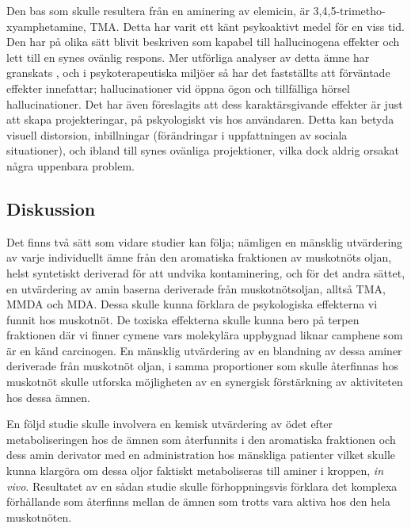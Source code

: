 \documentclass{theme/franska}
\begin{document}
{	Den bas som skulle resultera från en aminering av elemicin, är
	3,4,5-trimetho-xyamphetamine, TMA. Detta har varit ett känt psykoaktivt medel för en viss tid. \cite{peretz1955new}
	Den har på olika sätt blivit beskriven som kapabel till hallucinogena effekter
	och lett till en synes ovänlig respons. \cite{shulgin1995pihkal}
	Mer utförliga analyser av detta ämne har granskats \cite{shulgin1995pihkal}, och i psykoterapeutiska miljöer så har det fastställts att förväntade effekter innefattar; hallucinationer vid öppna ögon och tillfälliga hörsel hallucinationer.
	Det har även föreslagits att dess karaktärsgivande effekter är just att skapa projekteringar, på pskyologiskt vis hos användaren.
	Detta kan betyda visuell distorsion, inbillningar (förändringar i uppfattningen av sociala situationer), och ibland till synes ovänliga projektioner, vilka dock aldrig orsakat några uppenbara problem.

	\subsection{Diskussion}

Det finns två sätt som vidare studier kan följa; nämligen en mänsklig utvärdering
av varje individuellt ämne från den aromatiska fraktionen av muskotnöts oljan,
helst syntetiskt deriverad för att undvika kontaminering, och för det andra sättet,
en utvärdering av amin baserna deriverade från muskotnötsoljan, alltså
TMA, MMDA och MDA. Dessa skulle kunna förklara de psykologiska effekterna
vi funnit hos muskotnöt. De toxiska effekterna skulle kunna bero på terpen fraktionen
där vi finner cymene vars molekylära uppbygnad liknar camphene som är en känd
carcinogen. En mänsklig utvärdering av en blandning av dessa aminer deriverade från
muskotnöt oljan, i samma proportioner som skulle återfinnas hos muskotnöt skulle
utforska möjligheten av en synergisk förstärkning av aktiviteten hos dessa ämnen.

En följd studie skulle involvera en kemisk utvärdering av ödet efter metaboliseringen
hos de ämnen som återfunnits i den aromatiska fraktionen och dess amin derivator
med en administration hos mänskliga patienter vilket skulle kunna klargöra om dessa
oljor faktiskt metaboliseras till aminer i kroppen, \textit{in vivo}.
Resultatet av en sådan studie skulle förhoppningsvis förklara det
komplexa förhållande som återfinns mellan de ämnen som trotts vara aktiva
hos den hela muskotnöten.




}
\end{document}
